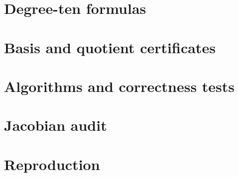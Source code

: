 \documentclass[11pt,a4paper]{article}
\begin{document}
\section{Degree-ten formulas}
\label{app:formulas}


\section{Basis and quotient certificates}
\label{app:certificates}


\section{Algorithms and correctness tests}
\label{app:algorithms}


\section{Jacobian audit}
\label{app:jacobian}


\section{Reproduction}
\label{app:reproduction}




\end{document}
